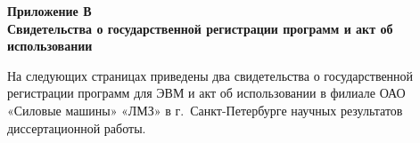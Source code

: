 \vspace{20mm}

\begin{flushleft}
  \LARGE
  \textbf{Приложение В \\ Свидетельства о государственной регистрации программ и акт об использовании}
\end{flushleft}

На следующих страницах приведены два свидетельства о государственной регистрации программ для ЭВМ и акт об 
использовании в филиале ОАО «Силовые машины» «ЛМЗ» в г.~Санкт-Петербурге научных результатов диссертационной 
работы.
\setcounter{chapter}{2}

%
%
%